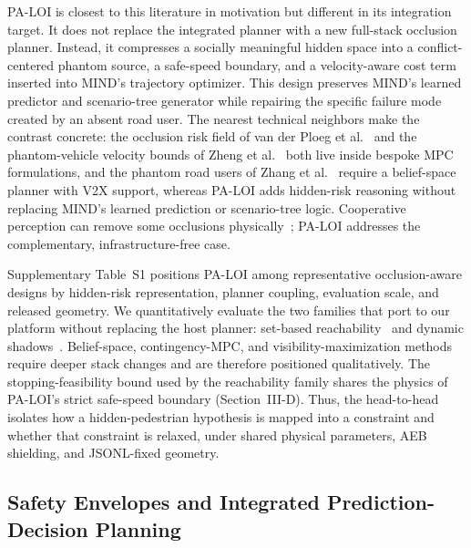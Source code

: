 \documentclass[journal]{IEEEtran}
\begin{document}
PA-LOI is closest to this literature in motivation but different in its integration target. It does not replace the integrated planner with a new full-stack occlusion planner. Instead, it compresses a socially meaningful hidden space into a conflict-centered phantom source, a safe-speed boundary, and a velocity-aware cost term inserted into MIND's trajectory optimizer. This design preserves MIND's learned predictor and scenario-tree generator while repairing the specific failure mode created by an absent road user. The nearest technical neighbors make the contrast concrete: the occlusion risk field of van der Ploeg et al.~\cite{vanderploeg2024riskfields} and the phantom-vehicle velocity bounds of Zheng et al.~\cite{zheng2026occlusioncontingency} both live inside bespoke MPC formulations, and the phantom road users of Zhang et al.~\cite{zhang2024v2xocclusion} require a belief-space planner with V2X support, whereas PA-LOI adds hidden-risk reasoning without replacing MIND's learned prediction or scenario-tree logic. Cooperative perception can remove some occlusions physically~\cite{zhang2024v2xocclusion}; PA-LOI addresses the complementary, infrastructure-free case.

Supplementary Table~S1 positions PA-LOI among representative occlusion-aware designs by hidden-risk representation, planner coupling, evaluation scale, and released geometry. We quantitatively evaluate the two families that port to our platform without replacing the host planner: set-based reachability~\cite{orzechowski2018tackling,koschi2021setbased} and dynamic shadows~\cite{nager2019shadows}. Belief-space, contingency-MPC, and visibility-maximization methods require deeper stack changes and are therefore positioned qualitatively. The stopping-feasibility bound used by the reachability family shares the physics of PA-LOI's strict safe-speed boundary (Section~III-D). Thus, the head-to-head isolates how a hidden-pedestrian hypothesis is mapped into a constraint and whether that constraint is relaxed, under shared physical parameters, AEB shielding, and JSONL-fixed geometry.

\subsection{Safety Envelopes and Integrated Prediction-Decision Planning}
\end{document}

